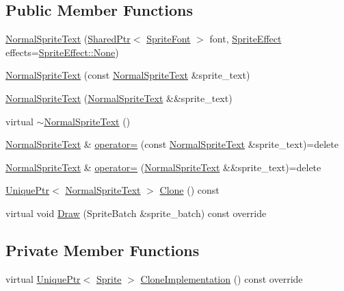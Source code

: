\subsection*{Public Member Functions}
\begin{DoxyCompactItemize}
\item 
\hyperlink{classmage_1_1_normal_sprite_text_a3943f079a5d18e27a2eca8c96fbfeb68}{Normal\+Sprite\+Text} (\hyperlink{namespacemage_a1e01ae66713838a7a67d30e44c67703e}{Shared\+Ptr}$<$ \hyperlink{classmage_1_1_sprite_font}{Sprite\+Font} $>$ font, \hyperlink{namespacemage_a9cfe18123066ba4236f548f9de75d881}{Sprite\+Effect} effects=\hyperlink{namespacemage_a5e7e18b0154373ce8fc942fe3f6b27fda6adf97f83acf6453d4a6a4b1070f3754}{Sprite\+Effect\+::\+None})
\item 
\hyperlink{classmage_1_1_normal_sprite_text_aa73a83a29b28d7b5f20240f3074e5d4d}{Normal\+Sprite\+Text} (const \hyperlink{classmage_1_1_normal_sprite_text}{Normal\+Sprite\+Text} \&sprite\+\_\+text)
\item 
\hyperlink{classmage_1_1_normal_sprite_text_ab2b8232a1bb1aa5294eaa335cb0ccd97}{Normal\+Sprite\+Text} (\hyperlink{classmage_1_1_normal_sprite_text}{Normal\+Sprite\+Text} \&\&sprite\+\_\+text)
\item 
virtual \hyperlink{classmage_1_1_normal_sprite_text_ae8575ab8ece5b8b923509fc7ab4d3dea}{$\sim$\+Normal\+Sprite\+Text} ()
\item 
\hyperlink{classmage_1_1_normal_sprite_text}{Normal\+Sprite\+Text} \& \hyperlink{classmage_1_1_normal_sprite_text_ab7dbd2e71dcaef5d6b7b767afa8d7094}{operator=} (const \hyperlink{classmage_1_1_normal_sprite_text}{Normal\+Sprite\+Text} \&sprite\+\_\+text)=delete
\item 
\hyperlink{classmage_1_1_normal_sprite_text}{Normal\+Sprite\+Text} \& \hyperlink{classmage_1_1_normal_sprite_text_a54cb023fad3b66dba35854ceaa50bc44}{operator=} (\hyperlink{classmage_1_1_normal_sprite_text}{Normal\+Sprite\+Text} \&\&sprite\+\_\+text)=delete
\item 
\hyperlink{namespacemage_a3316d7143a973e37adf1110f2e80ca31}{Unique\+Ptr}$<$ \hyperlink{classmage_1_1_normal_sprite_text}{Normal\+Sprite\+Text} $>$ \hyperlink{classmage_1_1_normal_sprite_text_a8357ea517cff639204da4825024d9d34}{Clone} () const
\item 
virtual void \hyperlink{classmage_1_1_normal_sprite_text_ad2a1b02bea18afd6bf61b106a727a355}{Draw} (Sprite\+Batch \&sprite\+\_\+batch) const override
\end{DoxyCompactItemize}
\subsection*{Private Member Functions}
\begin{DoxyCompactItemize}
\item 
virtual \hyperlink{namespacemage_a3316d7143a973e37adf1110f2e80ca31}{Unique\+Ptr}$<$ \hyperlink{classmage_1_1_sprite}{Sprite} $>$ \hyperlink{classmage_1_1_normal_sprite_text_acab5b61f8be4a475cd54b51278956e37}{Clone\+Implementation} () const override
\end{DoxyCompactItemize}
